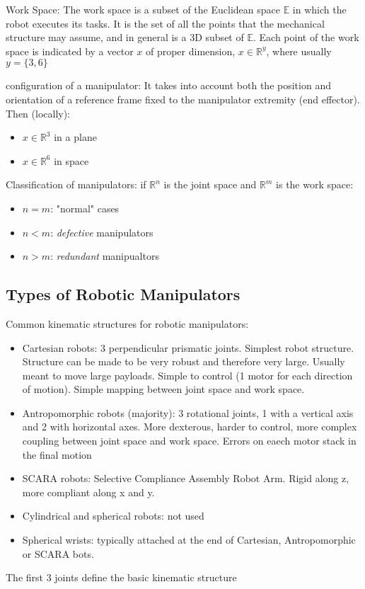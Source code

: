 \documentclass{book}
\begin{document}
Work Space: The work space is a subset of the Euclidean space $\mathbb{E}$ in which the robot executes its tasks. It is the set of all the points that the mechanical structure may assume, and in general is a 3D subset of $\mathbb{E}$. Each point of the work space is indicated by a vector $x$ of proper dimension, $x\in \mathbb{R}^y$, where usually $y=\{3,6\}$

configuration of a manipulator: It takes into account both the position and orientation of a reference frame  fixed to the manipulator extremity (end effector). Then (locally): \begin{itemize}
    \item $x\in\mathbb{R}^3$ in a plane
    \item $x\in\mathbb{R}^6$ in space
\end{itemize}

Classification of manipulators: if $\mathbb{R}^n$ is the joint space and $\mathbb{R}^m$ is the work space:
\begin{itemize}
    \item $n=m$: "normal" cases
    \item $n<m$: \emph{defective} manipulators
    \item $n>m$: \emph{redundant} manipualtors
\end{itemize}



\subsection{Types of Robotic Manipulators}

Common kinematic structures for robotic manipulators:
\begin{itemize}
    \item Cartesian robots: 3 perpendicular prismatic joints. Simplest robot structure. Structure can be made to be very robust and therefore very large. Usually meant to move large payloads. Simple to control (1 motor for each direction of motion). Simple mapping between joint space and work space.
    \item Antropomorphic robots (majority): 3 rotational joints, 1 with a vertical axis and 2 with horizontal axes. More dexterous, harder to control, more complex coupling between joint space and work space. Errors on eaech motor stack in the final motion
    \item SCARA robots: Selective Compliance Assembly Robot Arm. Rigid along z, more compliant along x and y.
    \item Cylindrical and spherical robots: not used
    \item Spherical wrists: typically attached at the end of Cartesian, Antropomorphic or SCARA bots.
\end{itemize}
The first 3 joints define the basic kinematic structure
\end{document}
